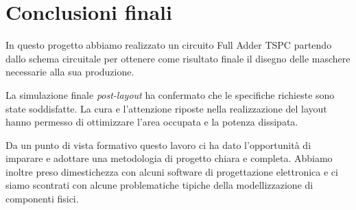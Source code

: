 
\chapter{Conclusioni finali} %
\label{Chapter5} 

In questo progetto abbiamo realizzato un circuito Full Adder TSPC partendo dallo schema circuitale per ottenere come risultato finale il disegno delle maschere necessarie alla sua produzione.

La simulazione finale \textit{post-layout} ha confermato che le specifiche richieste sono state soddisfatte. La cura e l'attenzione riposte nella realizzazione del layout hanno permesso di ottimizzare l'area occupata e la potenza dissipata.

Da un punto di vista formativo questo lavoro ci ha dato l'opportunità di imparare e adottare una metodologia di progetto chiara e completa. Abbiamo inoltre preso dimestichezza con alcuni software di progettazione elettronica e ci siamo scontrati con alcune problematiche tipiche della modellizzazione di componenti fisici.







